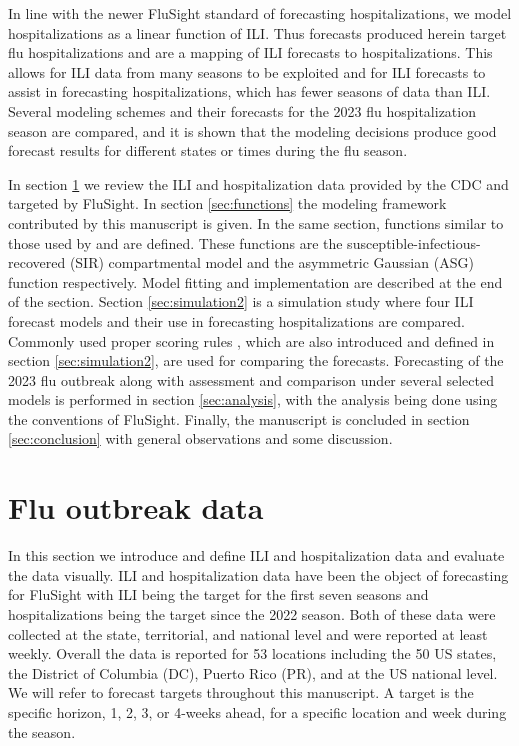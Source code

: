 \documentclass[ba]{imsart}
\theoremstyle{plain}
\theoremstyle{definition}
\theoremstyle{remark}
\begin{document}
In line with the newer FluSight standard of forecasting hospitalizations, we model hospitalizations as a linear function of ILI. Thus forecasts produced herein target flu hospitalizations and are a mapping of ILI forecasts to hospitalizations. This allows for ILI data from many seasons to be exploited and for ILI forecasts to assist in forecasting hospitalizations, which has fewer seasons of data than ILI. Several modeling schemes and their forecasts for the 2023 flu hospitalization season are compared, and it is shown that the modeling decisions produce good forecast results for different states or times during the flu season.

In section \ref{sec:data} we review the ILI and hospitalization data provided by the CDC and targeted by FluSight. 
In section \ref{sec:functions} the modeling framework contributed by this manuscript is given. In the same section, functions similar to those used by \cite{osthus2019dynamic} and \cite{ulloa2019} are defined.
 These functions are the susceptible-infectious-recovered (SIR) compartmental model and the asymmetric Gaussian (ASG) function  respectively. Model fitting and implementation are described at the end of the section. Section \ref{sec:simulation2} is a simulation study where four ILI forecast models and their use in forecasting hospitalizations are compared. Commonly used proper scoring rules \cite[]{gneiting2007strictly}, which are also introduced and defined in section \ref{sec:simulation2}, are used for comparing the forecasts. Forecasting of the 2023 flu outbreak along with assessment and comparison under several selected models is performed in section \ref{sec:analysis}, with the analysis being done using the conventions of FluSight. 
 Finally, the manuscript is concluded in section \ref{sec:conclusion} with general observations and some discussion.
 
 
 
 
 
 
 
 
 
 
 
 
 \section{Flu outbreak data} \label{sec:data}
In this section we introduce and define ILI and hospitalization data and evaluate the data visually. ILI and hospitalization data have been the object of forecasting for FluSight with ILI being the target for the first seven seasons and hospitalizations being the target since the 2022 season. Both of these data were collected at the state, territorial, and national level and were reported at least weekly. Overall the data is reported for 53 locations including the 50 US states, the District of Columbia (DC), Puerto Rico (PR), and at the US national level. We will refer to forecast targets throughout this manuscript. A target is the specific horizon, 1, 2, 3, or 4-weeks ahead, for a specific location and week during the season.  
\end{document}
